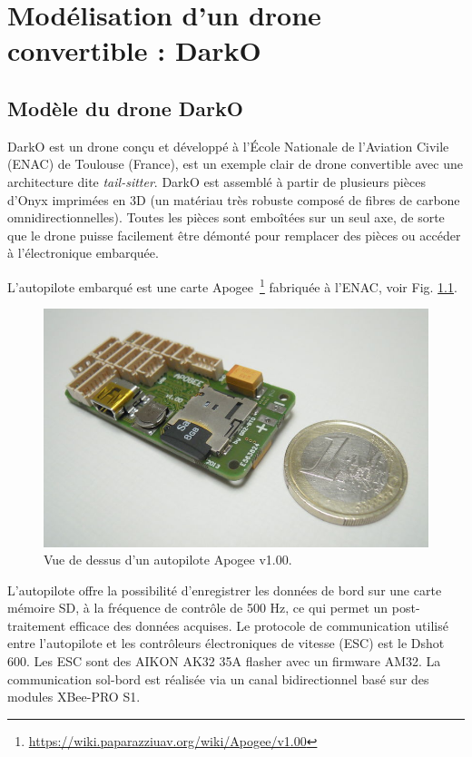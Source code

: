 \chapter{Modélisation d'un drone convertible : DarkO}
\minitoc

\section{Modèle du drone DarkO}
\label{sec:model}
DarkO est un drone conçu et développé à l'École Nationale de l'Aviation Civile (ENAC) de Toulouse (France), est un exemple clair de drone convertible avec une architecture dite \textit{tail-sitter}.
DarkO est assemblé à partir de plusieurs pièces d'Onyx imprimées en 3D (un matériau très robuste composé de fibres de carbone omnidirectionnelles). Toutes les pièces sont emboîtées sur un seul axe, de sorte que le drone puisse facilement être démonté pour remplacer des pièces ou accéder à l'électronique embarquée. 

L'autopilote embarqué est une carte Apogee~\footnote{\url{https://wiki.paparazziuav.org/wiki/Apogee/v1.00}} fabriquée à l'ENAC, voir Fig. \ref{fig:apogee}. 


\begin{figure}[ht]
    \centering
        \includegraphics[width=0.8\columnwidth]{figures/800px-Apogee_v100_top_1E.jpeg}
        \caption{Vue de dessus d'un autopilote Apogee v1.00.}
        \label{fig:apogee}
\end{figure}

L'autopilote offre la possibilité d'enregistrer les données de bord sur une carte mémoire SD, à la fréquence de contrôle de 500 Hz, ce qui permet un post-traitement efficace des données acquises. Le protocole de communication utilisé entre l'autopilote et les contrôleurs électroniques de vitesse (ESC) est le Dshot 600. Les ESC sont des AIKON AK32 35A  flasher avec un firmware AM32. La communication sol-bord est réalisée via un canal bidirectionnel basé sur des modules XBee-PRO S1.

